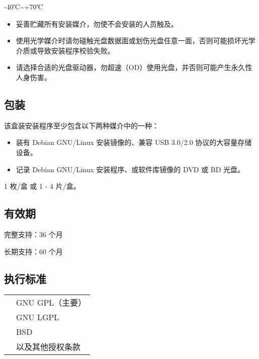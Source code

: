 \documentclass{article}
\begin{document}
\begin{multicols*}{3}
	-40℃\textasciitilde +70℃

	
	\begin{itemize}[leftmargin=*]
		\setlength{\itemsep}{0pt}
		\setlength{\parskip}{0pt}
		\setlength{\parsep}{0pt}
		\item 妥善贮藏所有安装媒介，勿使不会安装的人员触及。
		\item 使用光学媒介时请勿碰触光盘数据面或划伤光盘任意一面，否则可能损坏光学介质或导致安装程序校验失败。
		\item 请选择合适的光盘驱动器，勿超速（OD）使用光盘，并否则可能产生永久性人身伤害。
		\end{itemize}
	\medskip

	\begin{tcolorbox}
	\section*{包装}
	\end{tcolorbox}

	该盒装安装程序至少包含以下两种媒介中的一种：
	\begin{itemize}[leftmargin=*]
		\setlength{\itemsep}{0pt}
		\setlength{\parskip}{0pt}
		\setlength{\parsep}{0pt}
		\item 装有 Debian GNU/Linux 安装镜像的、兼容 USB 3.0/2.0 协议的大容量存储设备。
		\item 记录 Debian GNU/Linux 安装程序、或软件库镜像的 DVD 或 BD 光盘。
	\end{itemize}

	1 枚/盒 或 1 - 4 片/盒。

	\medskip


	\begin{tcolorbox}
	\section*{有效期}
	\end{tcolorbox}

	完整支持：36 个月

	长期支持：60 个月

	\medskip


	\begin{tcolorbox}
	\section*{执行标准}
	\end{tcolorbox}
	\begin{tabularx}{\linewidth}{@{}ll@{}}
		\multirow{4}{*}{}{开源许可证：} & GNU GPL（主要）\\
		~ & GNU LGPL \\
		~ & BSD \\
		~ & 以及其他授权条款 \\
	\end{tabularx}


\end{multicols*}
\end{document}
